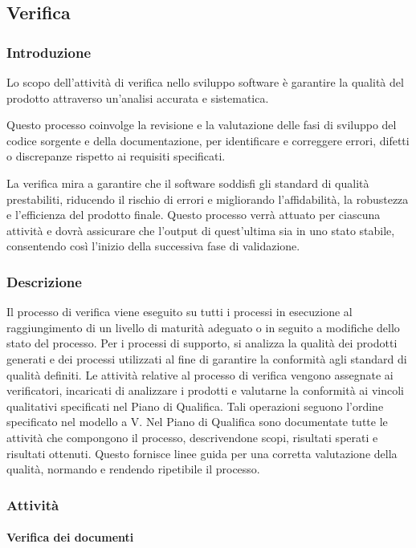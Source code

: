 \subsection{Verifica}\label{sec:verifica}
\subsubsection{Introduzione}
Lo scopo dell'attività di verifica nello sviluppo software è garantire la qualità del prodotto attraverso un'analisi accurata e sistematica. 

Questo processo coinvolge la revisione e la valutazione delle fasi di sviluppo del codice sorgente e della documentazione, per identificare e correggere errori, difetti o discrepanze rispetto ai requisiti specificati. 

La verifica mira a garantire che il software soddisfi gli standard di qualità prestabiliti, riducendo il rischio di errori e migliorando l'affidabilità, la robustezza e l'efficienza del prodotto finale.
Questo processo verrà attuato per ciascuna attività e dovrà assicurare che l'output di quest'ultima sia in uno stato stabile, consentendo così l'inizio della successiva fase di validazione. 

\subsubsection{Descrizione}
Il processo di verifica viene eseguito su tutti i processi in esecuzione al raggiungimento di un livello di maturità adeguato o in seguito a modifiche dello stato del processo. Per i processi di supporto, si analizza la qualità dei prodotti generati e dei processi utilizzati al fine di garantire la conformità agli standard di qualità definiti.
Le attività relative al processo di verifica vengono assegnate ai verificatori, incaricati di analizzare i prodotti e valutarne la conformità ai vincoli qualitativi specificati nel Piano di Qualifica. Tali operazioni seguono l'ordine specificato nel modello a V.
Nel Piano di Qualifica sono documentate tutte le attività che compongono il processo, descrivendone scopi, risultati sperati e risultati ottenuti. Questo fornisce linee guida per una corretta valutazione della qualità, normando e rendendo ripetibile il processo. 

\subsubsection{Attività}
\paragraph{Verifica dei documenti}\label{sec:verificatori}

